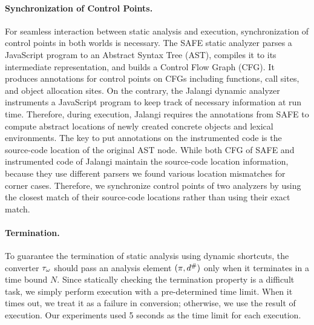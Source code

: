 \paragraph{Synchronization of Control Points.}
For seamless interaction between static analysis and {\sealed} execution,
synchronization of control points in both worlds is necessary.
The SAFE static analyzer parses a JavaScript program to an Abstract
Syntax Tree (AST), compiles it to its intermediate representation, and
builds a Control Flow Graph (CFG).  It produces annotations for
control points on CFGs including functions, call sites, and object allocation sites.
On the contrary, the Jalangi dynamic analyzer instruments a JavaScript program 
to keep track of necessary information at run time.  Therefore, during
{\sealed} execution, Jalangi requires the annotations from SAFE to compute
abstract locations of newly created concrete objects and lexical environments.
The key to put annotations on the instrumented code is the source-code
location of the original AST node.  While both CFG of SAFE and
instrumented code of Jalangi maintain the source-code location information,
because they use different parsers we found various location mismatches for corner cases.
Therefore, we synchronize control points of two analyzers by using the closest match
of their source-code locations rather than using their exact match.

\paragraph{}

\paragraph{Termination.}
To guarantee the termination of static analysis using dynamic shortcuts, the
converter ${\tau}_\omega$ should pass an analysis element $(\pi, {d}^{\#})$
only when it terminates in a time bound $N$.  Since statically checking the
termination property is a difficult task, we simply perform {\sealed}
execution with a pre-determined time limit.  When it times out,
we treat it as a failure in conversion;
otherwise, we use the result of {\sealed} execution.  Our experiments used
5 seconds as the time limit for each {\sealed} execution.


